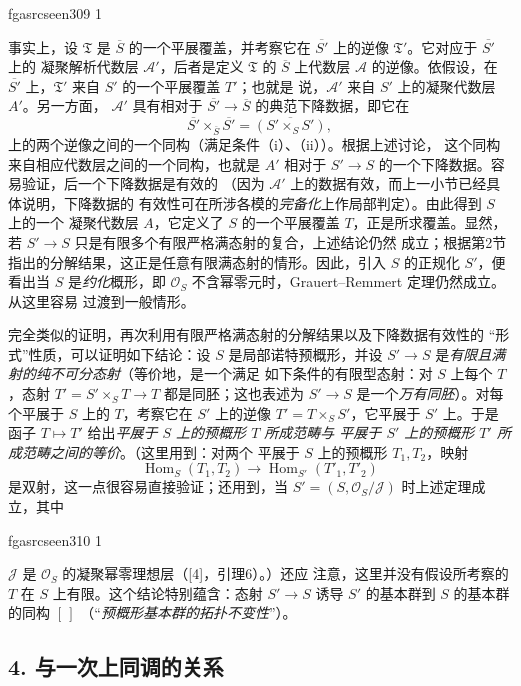 \documentclass[12pt,twoside,openany]{book}
\numberwithin{equation}{section}
\newcommand{\fgaunitid}{unbound}
\newcommand{\src}[1]{%
  \phantomsection
  \hypertarget{src:\fgaunitid:#1}{}%
  \hypertarget{fga.\fgaunitid.p#1}{}%
  \ifcsname fgasrcseen#1\endcsname\else
    \expandafter\gdef\csname fgasrcseen#1\endcsname{1}%
    \hypertarget{src:#1}{}%
  \fi
  \marginpar{\raggedleft\footnotesize\sffamily #1}%
}
\newcommand{\fquote}[1]{“#1”}
\theoremstyle{plain}
\theoremstyle{definition}
\theoremstyle{remark}
\begin{document}
\src{309}
事实上，设 $\mathfrak T$ 是 $\overline S$ 的一个平展覆盖，并考察它在
$\overline{S'}$ 上的逆像 $\mathfrak T'$。它对应于 $\overline{S'}$ 上的
凝聚解析代数层 $\mathcal A'$，后者是定义 $\mathfrak T$ 的
$\overline S$ 上代数层 $\mathcal A$ 的逆像。依假设，在
$\overline{S'}$ 上，$\mathfrak T'$ 来自 $S'$ 的一个平展覆盖 $T'$；也就是
说，$\mathcal A'$ 来自 $S'$ 上的凝聚代数层 $A'$。另一方面，
$\mathcal A'$ 具有相对于
$\overline{S'}\longrightarrow\overline S$ 的典范下降数据，即它在
\[
  \overline{S'}\times_{\overline S}\overline{S'}
  =\overline{(S'\times_SS')},
\]
上的两个逆像之间的一个同构（满足条件（i）、（ii））。根据上述讨论，
这个同构来自相应代数层之间的一个同构，也就是 $A'$ 相对于
$S'\longrightarrow S$ 的一个下降数据。容易验证，后一个下降数据是有效的
（因为 $\mathcal A'$ 上的数据有效，而上一小节已经具体说明，下降数据的
有效性可在所涉各模的\emph{完备化}上作局部判定）。由此得到 $S$ 上的一个
凝聚代数层 $A$，它定义了 $S$ 的一个平展覆盖 $T$，正是所求覆盖。显然，若
$S'\longrightarrow S$ 只是有限多个有限严格满态射的复合，上述结论仍然
成立；根据第2节指出的分解结果，这正是任意有限满态射的情形。因此，引入
$S$ 的正规化 $S'$，便看出当 $S$ 是\emph{约化}概形，即
$\mathcal O_S$ 不含幂零元时，Grauert--Remmert 定理仍然成立。从这里容易
过渡到一般情形。

完全类似的证明，再次利用有限严格满态射的分解结果以及下降数据有效性的
\fquote{形式}性质，可以证明如下结论：设 $S$ 是局部诺特预概形，并设
$S'\longrightarrow S$ 是\emph{有限且满射的纯不可分态射}（等价地，是一个满足
如下条件的有限型态射：对 $S$ 上每个 $T$，态射
$T'=S'\times_ST\longrightarrow T$ 都是同胚；这也表述为
$S'\longrightarrow S$ 是一个\emph{万有同胚}）。对每个平展于 $S$ 上的
$T$，考察它在 $S'$ 上的逆像 $T'=T\times_SS'$，它平展于 $S'$ 上。于是
函子 $T\longmapsto T'$ 给出\emph{平展于 $S$ 上的预概形 $T$ 所成范畴与
平展于 $S'$ 上的预概形 $T'$ 所成范畴之间的等价}。（这里用到：对两个
平展于 $S$ 上的预概形 $T_1,T_2$，映射
\[
  \operatorname{Hom}_S(T_1,T_2)\longrightarrow
  \operatorname{Hom}_{S'}(T'_1,T'_2)
\]
是双射，这一点很容易直接验证；还用到，当
$S'=(S,\mathcal O_S/\mathcal J)$ 时上述定理成立，其中

\src{310}
$\mathcal J$ 是 $\mathcal O_S$ 的凝聚幂零理想层（[4]，引理6）。）还应
注意，这里并没有假设所考察的 $T$ 在 $S$ 上有限。这个结论特别蕴含：态射
$S'\longrightarrow S$ 诱导 $S'$ 的基本群到 $S$ 的基本群的同构 $[\,]$
（\fquote{\emph{预概形基本群的拓扑不变性}}）。

\subsection*{4. 与一次上同调的关系}
\end{document}
